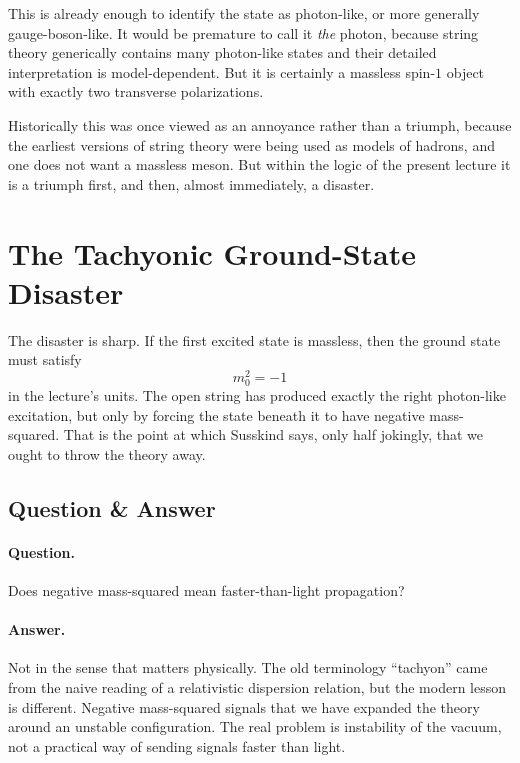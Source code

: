 This is already enough to identify the state as photon-like, or more generally gauge-boson-like. It would be premature to call it \emph{the} photon, because string theory generically contains many photon-like states and their detailed interpretation is model-dependent. But it is certainly a massless spin-\(1\) object with exactly two transverse polarizations.

Historically this was once viewed as an annoyance rather than a triumph, because the earliest versions of string theory were being used as models of hadrons, and one does not want a massless meson. But within the logic of the present lecture it is a triumph first, and then, almost immediately, a disaster.

\section{The Tachyonic Ground-State Disaster}

The disaster is sharp. If the first excited state is massless, then the ground state must satisfy
\begin{equation}
m_0^2=-1
\end{equation}
in the lecture's units. The open string has produced exactly the right photon-like excitation, but only by forcing the state beneath it to have negative mass-squared. That is the point at which Susskind says, only half jokingly, that we ought to throw the theory away.

\subsection{Question \& Answer}

\paragraph{Question.} Does negative mass-squared mean faster-than-light propagation?

\paragraph{Answer.} Not in the sense that matters physically. The old terminology ``tachyon'' came from the naive reading of a relativistic dispersion relation, but the modern lesson is different. Negative mass-squared signals that we have expanded the theory around an unstable configuration. The real problem is instability of the vacuum, not a practical way of sending signals faster than light.

